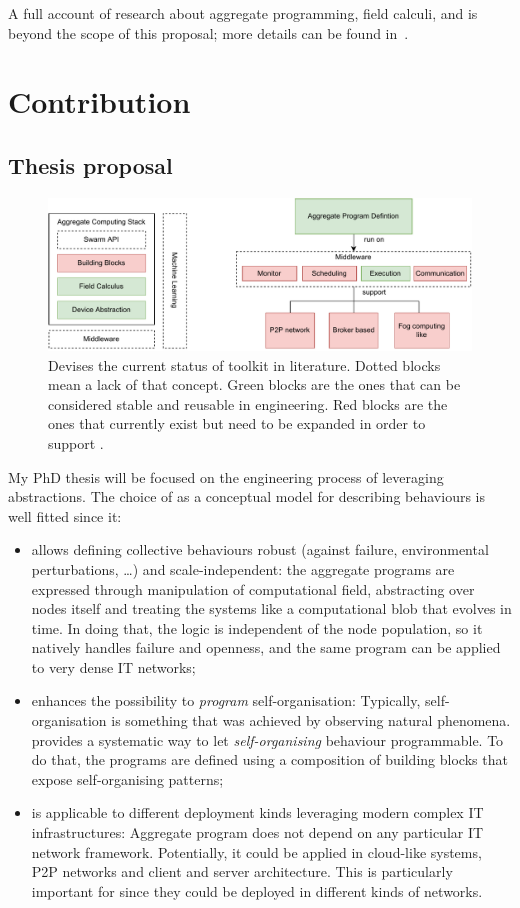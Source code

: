 \documentclass[11pt]{article}
\begin{document}
A full account of research about aggregate programming, field calculi, and \scafi{} is beyond the scope of this proposal; more details can be found in~\cite{viroli2019jlamp-si-coord,DBLP:journals/eaai/CasadeiVAPD21}.

\section{Contribution} \label{contribution}
\subsection{Thesis proposal}
\begin{figure}
	\centering
	\includegraphics[width=\textwidth]{img/to-do-for-thesis.pdf}
	\caption{Devises the current status of \ac{} toolkit in literature. Dotted blocks mean a lack of that concept. Green blocks are the ones that can be considered stable and reusable in \cpsw{} engineering. Red blocks are the ones that currently exist but need to be expanded in order to support \cpsw{}.}
	\label{fig:current-state}
\end{figure}
My PhD thesis will be focused on the engineering process of \cpsw{} leveraging \ac{} abstractions. The choice of \ac{} as a conceptual model for describing \cpsw{} behaviours is well fitted since it:
\begin{itemize}
	\item allows defining collective behaviours robust (against failure, environmental perturbations, \dots{}) and scale-independent: the aggregate programs are expressed through manipulation of computational field, abstracting over nodes itself and treating the systems like a computational blob that evolves in time. In doing that, the logic is independent of the node population, so it natively handles failure and openness, and the same program can be applied to very dense IT networks;
	\item enhances the possibility to \textit{program} self-organisation: Typically, self-organisation is something that was achieved by observing natural phenomena. \ac{} provides a systematic way to let \textit{self-organising} behaviour programmable. To do that, the programs are defined using a composition of building blocks that expose self-organising patterns;
	\item is applicable to different deployment kinds leveraging modern complex IT infrastructures: Aggregate program does not depend on any particular IT network framework. Potentially, it could be applied in cloud-like systems, P2P networks and client and server architecture. This is particularly important for \cpsw{} since they could be deployed in different kinds of networks.
\end{itemize}
\end{document}

